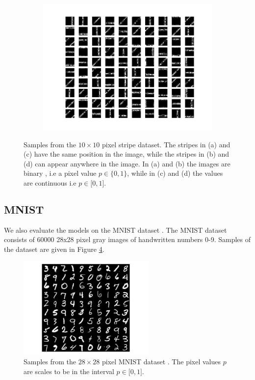\begin{figure}[h!]
\begin{subfigure}[t]{.49\textwidth}
  		\caption{}
  		\label{fig:stripes3}
	\end{subfigure}
	\begin{subfigure}[t]{.49\textwidth}
  		\centering
  		\includegraphics[width=.9\linewidth]{imgs/stripes4.png}
  		\caption{}
  		\label{fig:stripes4}
	\end{subfigure}
	\caption{Samples from the $10 \times 10$ pixel stripe dataset. The stripes in (a) and (c) have the same position in the image, while the stripes in (b) and (d) can appear anywhere in the image. In (a) and (b) the images are binary , i.e a pixel value $p \in \{0,1\}$, while in (c) and (d) the values are continuous i.e $p \in \lbrack 0,1 \rbrack $.  }
	\label{fig:stripes}
\end{figure}

 
\subsection{MNIST} \label{c:mnist}

We also evaluate the models on the MNIST dataset \cite{lecun-mnisthandwrittendigit-2010}. 
The MNIST dataset consists of 60000 28x28 pixel gray images of handwritten numbers 0-9.
Samples of the dataset are given in Figure \ref{fig:mnist}.

\begin{figure}[h!]
	\centering
    	\includegraphics[width=0.6\textwidth]{imgs/mnist.png} 
    \caption{Samples from the $28 \times 28$ pixel MNIST dataset \cite{lecun-mnisthandwrittendigit-2010}. The pixel values $p$ are scales to be in the interval $p \in \lbrack 0,1 \rbrack $. }
	\label{fig:mnist}
\end{figure}


